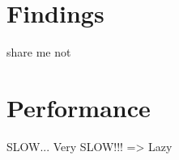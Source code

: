 \section{Findings}
\label{sec:Findings}
 share me not


\section{Performance}
\label{sec:performance}
SLOW... Very SLOW!!! => Lazy \cite{TAJSDOM,TAJS}